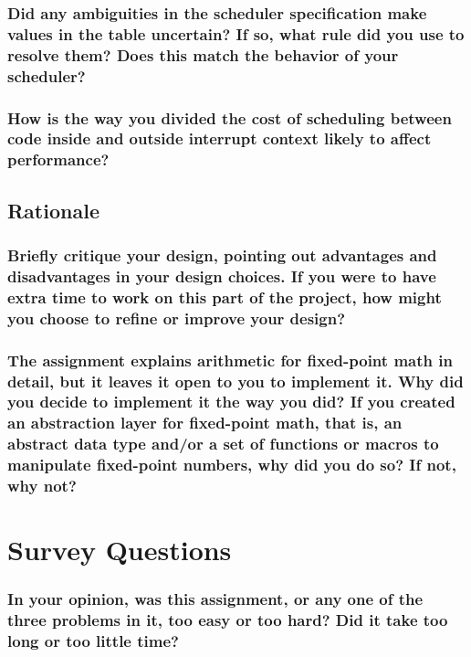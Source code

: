 \documentclass[sigconf, nonacm]{acmart}
\begin{document}
            \subsubsection{Did any ambiguities in the scheduler specification make values in the table uncertain? If so, what rule did you use to resolve them? Does this match the behavior of your scheduler? }

            \subsubsection{How is the way you divided the cost of scheduling between code inside and outside interrupt context likely to affect performance? }

        \subsection{Rationale}

            \subsubsection{Briefly critique your design, pointing out advantages and disadvantages in your design choices. If you were to have extra time to work on this part of the project, how might you choose to refine or improve your design? }

            \subsubsection{The assignment explains arithmetic for fixed-point math in detail, but it leaves it open to you to implement it. Why did you decide to implement it the way you did? If you created an abstraction layer for fixed-point math, that is, an abstract data type and/or a set of functions or macros to manipulate fixed-point numbers, why did you do so? If not, why not?}
    
    \section{Survey Questions}

        \subsubsection*{In your opinion, was this assignment, or any one of the three problems in it, too easy or too hard? Did it take too long or too little time? }
\end{document}
